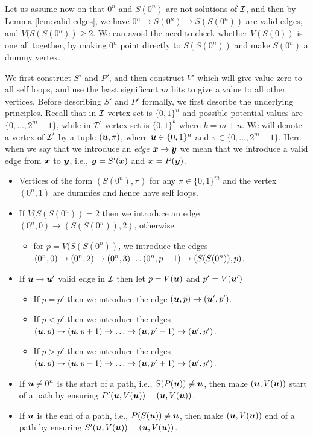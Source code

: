 Let us assume now on that $0^n$ and $S(0^n)$ are not solutions of $\mbox{${\mathcal I}$}$, and
then by Lemma \ref{lem:valid-edges}, we have $0^n \rightarrow S(0^n) \rightarrow
S(S(0^n))$ are valid edges, and $V(S(S(0^n))\ge 2$. We can avoid the need to check
whether $V(S(0))$ is one all together, by making $0^n$ point directly to
$S(S(0^n))$ and make $S(0^n)$ a dummy vertex. 

We first construct $S'$ and $P'$, and then construct $V'$ which will give
value zero to all self loops, and use the least significant $m$ bits to give a
value to all other vertices.
Before describing $S'$ and $P'$ formally, we first describe the underlying
principles. Recall that in $\mbox{${\mathcal I}$}$ vertex set is $\{0,1\}^n$ and possible potential values are $\{0,\dots,2^m-1\}$, while in $\mbox{${\mathcal I}$}'$ vertex set is $\{0,1\}^k$ where $k=m+n$. 
We will denote a vertex of $\mbox{${\mathcal I}$}'$ by a tuple $(\mbox{\boldmath $u$},\pi)$, where $\mbox{\boldmath $u$} \in
\{0,1\}^n$ and $\pi\in \{0,\dots,2^m-1\}$. 
Here when we say that we introduce an {\em edge $\mbox{\boldmath $x$}\rightarrow \mbox{\boldmath $y$}$} we mean
that we introduce a valid edge from $\mbox{\boldmath $x$}$ to $\mbox{\boldmath $y$}$, i.e., $\mbox{\boldmath $y$}=S'(\mbox{\boldmath $x$})$ and $\mbox{\boldmath $x$}=P(\mbox{\boldmath $y$})$. 
\begin{itemize}
\item Vertices of the form $(S(0^n),\pi)$ for any $\pi \in \{0,1\}^m$ and the vertex $(0^n,1)$ are
dummies and hence have self loops.
\item If $V(S(S(0^n))=2$ then we introduce an edge $(0^n,0)\rightarrow(S(S(0^n)),2)$, otherwise 
\begin{itemize}
\item for $p=V(S(S(0^n))$, we introduce the edges $(0^n,0)\rightarrow (0^n,2)\rightarrow (0^n, 3)\dots (0^n,p-1)\rightarrow (S(S(0^n)),p)$.
\end{itemize}
\item If $\mbox{\boldmath $u$} \rightarrow \mbox{\boldmath $u$}'$ valid edge in $\mbox{${\mathcal I}$}$ then let $p=V(\mbox{\boldmath $u$})$ and $p'=V(\mbox{\boldmath $u$}')$
\begin{itemize}
\item If $p=p'$ then we introduce the edge $(\mbox{\boldmath $u$},p)\rightarrow (\mbox{\boldmath $u$}',p')$. %
\item If $p<p'$ then we introduce the edges $(\uu,p)\ra (\uu,p+1)\ra \dots\ra (\uu,p'-1)\ra (\uu',p')$.
\item If $p>p'$ then we introduce the edges $(\uu,p)\ra (\uu,p-1)\ra \dots\ra (\uu,p'+1)\ra (\uu',p')$.
\end{itemize}
\item If $\mbox{\boldmath $u$}\neq 0^n$ is the start of a path, i.e., $S(P(\mbox{\boldmath $u$}))\neq \mbox{\boldmath $u$}$, then
make $(\mbox{\boldmath $u$},V(\mbox{\boldmath $u$}))$ start of a path by ensuring $P'(\mbox{\boldmath $u$},V(\mbox{\boldmath $u$}))=(\mbox{\boldmath $u$},V(\mbox{\boldmath $u$}))$.
\item If $\mbox{\boldmath $u$}$ is the end of a path, i.e., $P(S(\mbox{\boldmath $u$}))\neq \mbox{\boldmath $u$}$, then make
$(\mbox{\boldmath $u$},V(\mbox{\boldmath $u$}))$ end of a path by ensuring $S'(\mbox{\boldmath $u$},V(\mbox{\boldmath $u$}))=(\mbox{\boldmath $u$},V(\mbox{\boldmath $u$}))$.
\end{itemize}

